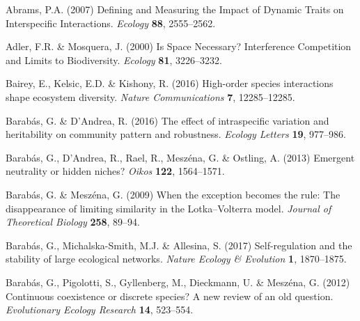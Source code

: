 \documentclass[11pt]{article}
\begin{document}
%
%
\begin{thebibliography}{51}
\providecommand{\natexlab}[1]{#1}

Abrams, P.A. (2007) Defining and {Measuring} the {Impact} of {Dynamic} {Traits}
  on {Interspecific} {Interactions}. \emph{Ecology} \textbf{88}, 2555--2562.

Adler, F.R. \& Mosquera, J. (2000) Is {Space} {Necessary}? {Interference}
  {Competition} and {Limits} to {Biodiversity}. \emph{Ecology} \textbf{81},
  3226--3232.

Bairey, E., Kelsic, E.D. \& Kishony, R. (2016) High-order species interactions
  shape ecosystem diversity. \emph{Nature Communications} \textbf{7},
  12285--12285.

Barab{\'a}s, G. \& D'Andrea, R. (2016) The effect of intraspecific variation
  and heritability on community pattern and robustness. \emph{Ecology Letters}
  \textbf{19}, 977--986.

Barab\'{a}s, G., {D'Andrea}, R., Rael, R., Mesz{\'e}na, G. \& Ostling, A.
  (2013) Emergent neutrality or hidden niches? \emph{Oikos} \textbf{122},
  1564--1571.

Barabás, G. \& Meszéna, G. (2009) When the exception becomes the rule: {The}
  disappearance of limiting similarity in the {Lotka}–{Volterra} model.
  \emph{Journal of Theoretical Biology} \textbf{258}, 89--94.

Barabás, G., Michalska-Smith, M.J. \& Allesina, S. (2017) Self-regulation and
  the stability of large ecological networks. \emph{Nature Ecology \&
  Evolution} \textbf{1}, 1870--1875.

Barabás, G., Pigolotti, S., Gyllenberg, M., Dieckmann, U. \& Meszéna, G.
  (2012) Continuous coexistence or discrete species? {A} new review of an old
  question. \emph{Evolutionary Ecology Research} \textbf{14}, 523--554.


\end{thebibliography}
\end{document}
